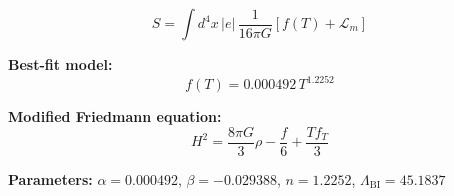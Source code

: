 
\begin{equation}
  S = \int d^4x \, |e| \, \frac{1}{16\pi G} \left[ f(T) + \mathcal{L}_m \right]
\end{equation}

\textbf{Best-fit model:}
\begin{equation}
  f(T) = 0.000492 \, T^{1.2252}
\end{equation}

\textbf{Modified Friedmann equation:}
\begin{equation}
  H^2 = \frac{8\pi G}{3} \rho - \frac{f}{6} + \frac{T f_T}{3}
\end{equation}

\textbf{Parameters:}
$\alpha = 0.000492$, \quad
$\beta = -0.029388$, \quad
$n = 1.2252$, \quad
$\Lambda_{\text{BI}} = 45.1837$